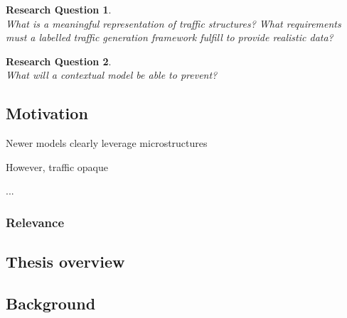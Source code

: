 \documentclass[a4paper,12pt,twoside]{article}
\newtheorem{rquestion}{Research Question}
\begin{document}
\begin{rquestion}\ \\
What is a meaningful representation of traffic structures? What requirements must a labelled traffic generation framework fulfill to provide realistic data?
\end{rquestion}


\begin{rquestion}\ \\
What will a contextual model be able to prevent? 
\end{rquestion}

\subsection{Motivation}

Newer models clearly leverage microstructures

However, traffic opaque 

...

\subsubsection{Relevance}

\subsection{Thesis overview}

\subsection{Background}
\end{document}
